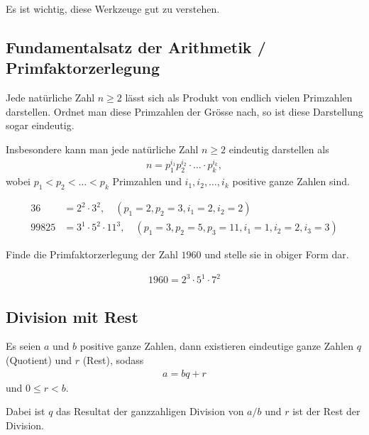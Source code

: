 Es ist wichtig, diese Werkzeuge gut zu verstehen.

\subsection{Fundamentalsatz der Arithmetik / Primfaktorzerlegung}
Jede natürliche Zahl \(n \geq 2\) lässt sich als Produkt von endlich vielen Primzahlen darstellen. Ordnet man diese Primzahlen der Grösse nach, so ist diese Darstellung sogar eindeutig.

Insbesondere kann man jede natürliche Zahl $n\geq 2$ eindeutig darstellen als
\begin{align}
	n = p_{1}^{i_1}p_{2}^{i_2}\cdot \ldots \cdot p_{k}^{i_k},
\end{align}
wobei $p_1<p_2<\ldots <p_k$ Primzahlen und $i_1, i_2, \ldots , i_k$ positive ganze Zahlen sind.

\begin{myexample}
\begin{align*}
	36    & = 2^2\cdot 3^2, \quad (p_1 = 2, p_2 = 3, i_1 = 2, i_2 = 2)                               \\
	99825 & = 3^1\cdot 5^2 \cdot 11^3, \quad (p_1 = 3, p_2 = 5, p_3 = 11, i_1 = 1, i_2 = 2, i_3 = 3)
\end{align*}
\end{myexample}

\begin{myexercise}
	Finde die Primfaktorzerlegung der Zahl $1960$ und stelle sie in obiger Form dar.
	\begin{myanswer}
		\begin{align*}
			1960 = 2^3\cdot 5^1\cdot 7^2
		\end{align*}
	\end{myanswer}
\end{myexercise}

\subsection{Division mit Rest}

Es seien $a$ und $b$ positive ganze Zahlen, dann existieren eindeutige ganze Zahlen $q$ (Quotient) und $r$ (Rest), sodass
\begin{align}\label{eq:divisionMitRest}
	a = bq + r
\end{align}
und $0\leq r < b$.

Dabei ist $q$ das Resultat der ganzzahligen Division von $a / b$ und $r$ ist der Rest der Division.

